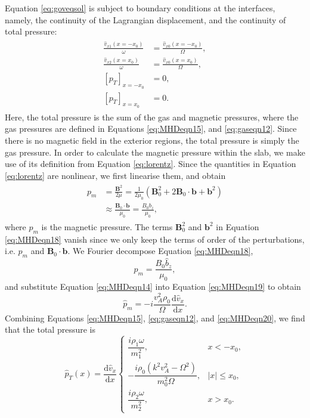 \documentclass[12pt]{ociamthesis}
\begin{document}
Equation \eqref{eq:goveqsol} is subject to boundary conditions at the interfaces, namely, the continuity of the Lagrangian displacement, and the continuity of total pressure:
\begin{align}
\begin{split}
\label{eq:bcs}
\frac{\hat v_{x1} (x = - x_0)}{\omega}
& = \frac{\hat v_{x0} (x = - x_0)}{\Omega},
\\[0.3cm]
\frac{\hat v_{x2} (x = x_0)}{\omega}
& = \frac{\hat v_{x0} (x = x_0)}{\Omega},
\\[0.3cm]
[p_T]_{x = -x_0}
& = 0,
\\[0.3cm]
[p_T]_{x = x_0} 
& = 0.
\end{split}
\end{align}
Here, the total pressure is the sum of the gas and magnetic pressures, where the gas pressures are defined in Equations \eqref{eq:MHDeqn15}, and \eqref{eq:gaseqn12}.
Since there is no magnetic field in the exterior regions, the total pressure is simply the gas pressure.
In order to calculate the magnetic pressure within the slab, we make use of its definition from Equation \eqref{eq:lorentz}.
Since the quantities in Equation \eqref{eq:lorentz} are nonlinear, we first linearise them, and obtain
%
\begin{align}
\begin{split}
\label{eq:MHDeqn18}
p_m & = \frac{\mathbf{B}^2}{2 \mu}
= \frac{1}{2 \mu_0} ( \mathbf{B}_0^2 + 2 \mathbf{B}_0 \cdot \mathbf{b} + \mathbf{b}^2 )
\\[0.3cm]
& \approx \frac{\mathbf{B}_0 \cdot \mathbf{b}}{\mu_0}
= \frac{B_0 b_z}{\mu_0},
\end{split}
\end{align}
%
where $p_m$ is the magnetic pressure.
The terms $\mathbf{B}_0^2$ and $\mathbf{b}^2$ in Equation \eqref{eq:MHDeqn18} vanish since we only keep the terms of order of the perturbations, i.e. $p_m$ and $\mathbf{B}_0 \cdot \mathbf{b}$.
We Fourier decompose Equation \eqref{eq:MHDeqn18},
%
\begin{equation}
\label{eq:MHDeqn19}
\hat p_m = \frac{B_0 \hat b_z}{\mu_0},
\end{equation}
%
and substitute Equation \eqref{eq:MHDeqn14} into Equation \eqref{eq:MHDeqn19} to obtain
%
\begin{equation}
\label{eq:MHDeqn20}
\hat p_m = - i \frac{v_A^2 \rho_0}{\Omega} \frac{\mathrm{d} \hat v_x}{\mathrm{d} x}.
\end{equation}
Combining Equations \eqref{eq:MHDeqn15}, \eqref{eq:gaseqn12}, and \eqref{eq:MHDeqn20}, we find that the total pressure is
\begin{equation}
\label{eq:totalpres}
\hat p_{T} (x) = \frac{\mathrm{d} \hat v_x}{\mathrm{d} x}
\begin{cases}
\dfrac{i \rho_1 \omega}{m_1^2},    & x < - x_0,
\\[0.3cm]
-\dfrac{i \rho_0 (k^2 v_A^2 - \Omega^2)}{m_0^2 \Omega},  & |x| \leq x_0,
\\[0.3cm]
\dfrac{i \rho_2 \omega}{m_2^2},    & x > x_0.
\end{cases}
\end{equation}
\end{document}
